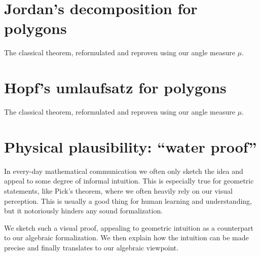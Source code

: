\documentclass[a4paper]{amsart}
\numberwithin{equation}{section}
\theoremstyle{plain}
\theoremstyle{definition}
\begin{document}
\section{Jordan's decomposition for polygons}

The classical theorem, reformulated and reproven using our angle measure $\mu$.


\section{Hopf's umlaufsatz for polygons}

The classical theorem, reformulated and reproven using our angle measure $\mu$.


\section{Physical plausibility: ``water proof'' }

In every-day mathematical communication we often only sketch
the idea and appeal to some degree of informal intuition.
This is especially true for geometric statements,
like Pick's theorem, where we often heavily rely on our visual perception.
This is usually a good thing for human learning and understanding,
but it notoriously hinders any sound formalization.

We sketch such a visual proof, appealing to geometric intuition
as a counterpart to our algebraic formalization.
We then explain how the intuition can be made precise
and finally translates to our algebraic viewpoint.
\end{document}
